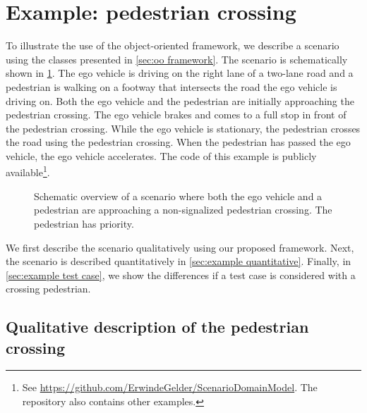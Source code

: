 \section{Example: pedestrian crossing}
\label{sec:example}

To illustrate the use of the \cstartb object-oriented framework\cendb, we describe a scenario using the \cstartb classes \cendb presented in \cref{sec:oo framework}. The scenario is schematically shown in \cref{fig:scenario overview}. The ego vehicle is driving on the right lane of a two-lane road and a pedestrian is walking on a footway that intersects the road the ego vehicle is driving on. Both the ego vehicle and the pedestrian are initially approaching the pedestrian crossing. The ego vehicle brakes and comes to a full stop in front of the pedestrian crossing. While the ego vehicle is stationary, the pedestrian crosses the road using the pedestrian crossing. When the pedestrian has passed the ego vehicle, the ego vehicle accelerates. The code of this example is publicly available\footnote{See \url{https://github.com/ErwindeGelder/ScenarioDomainModel}. The repository also contains other examples.}.

\setlength{\figurewidth}{0.4\linewidth}
\begin{figure}[t]
	\centering
	
	\caption{Schematic overview of a scenario where both the ego vehicle and a pedestrian are approaching a non-signalized pedestrian crossing. The pedestrian has priority. 
	}
	\label{fig:scenario overview}
\end{figure}



We first describe the scenario qualitatively using our proposed \cstartb framework\cendb. Next, the scenario is described quantitatively in \cref{sec:example quantitative}. Finally, in \cref{sec:example test case}, we show the differences if a test case is considered with a crossing pedestrian.



\subsection{Qualitative description of the pedestrian crossing}
\label{sec:example qualitative}

